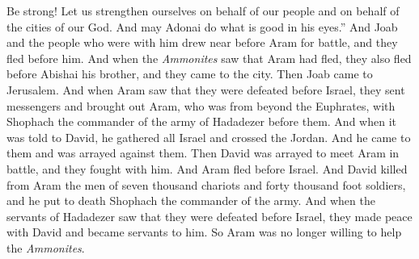 \begin{biblechapter}
\verse Be strong! Let us strengthen ourselves on behalf of our people and on behalf of the cities of our God. And may Adonai do what is good in his eyes.”
\verse And Joab and the people who were with him drew near before Aram for battle, and they fled before him.
\verse And when the \textit{Ammonites} saw that Aram had fled, they also fled before Abishai his brother, and they came to the city. Then Joab came to Jerusalem.
\verse And when Aram saw that they were defeated before Israel, they sent messengers and brought out Aram, who was from beyond the Euphrates, with Shophach the commander of the army of Hadadezer before them.
\verse And when it was told to David, he gathered all Israel and crossed the Jordan. And he came to them and was arrayed against them. Then David was arrayed to meet Aram in battle, and they fought with him.
\verse And Aram fled before Israel. And David killed from Aram the men of seven thousand chariots and forty thousand foot soldiers, and he put to death Shophach the commander of the army.
\verse And when the servants of Hadadezer saw that they were defeated before Israel, they made peace with David and became servants to him. So Aram was no longer willing to help the \textit{Ammonites}.
\end{biblechapter}

